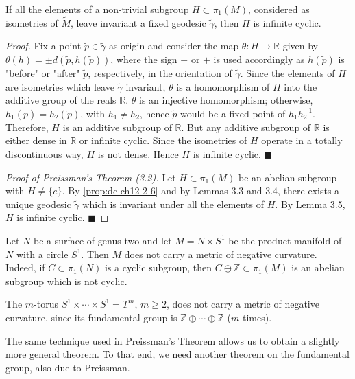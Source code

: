\begin{lemma}
  \label{lem:dc-ch12-3-5}
  If all the elements of a non-trivial subgroup $H\subset\pi_1(M)$, considered as
  isometries of $\tilde{M}$, leave invariant a fixed geodesic $\tilde{\gamma}$, then
  $H$ is infinite cyclic.
\end{lemma}
\begin{proof}
  Fix a point $\tilde{p}\in\tilde{\gamma}$ as origin and consider the map
  $\theta:H\to\mathbb{R}$ given by $\theta(h)=\pm d(\tilde{p},h(\tilde{p}))$, where
  the sign $-$ or $+$ is used accordingly as $h(\tilde{p})$ is "before" or "after"
  $\tilde{p}$, respectively, in the orientation of $\tilde{\gamma}$. Since the
  elements of $H$ are isometries which leave $\tilde{\gamma}$ invariant, $\theta$ is
  a homomorphism of $H$ into the additive group of the reals $\mathbb{R}$. $\theta$
  is an injective homomorphism; otherwise, $h_1(\tilde{p})=h_2(\tilde{p})$, with
  $h_1\neq h_2$, hence $\tilde{p}$ would be a fixed point of $h_1h_2^{-1}$.
  Therefore, $H$ is an additive subgroup of $\mathbb{R}$. But any additive subgroup
  of $\mathbb{R}$ is either dense in $\mathbb{R}$ or infinite cyclic. Since the
  isometries of $H$ operate in a totally discontinuous way, $H$ is not dense. Hence
  $H$ is infinite cyclic. $\blacksquare$
  
  \emph{Proof of Preissman's Theorem (3.2).} Let $H\subset\pi_1(M)$ be an abelian
  subgroup with $H\neq\{e\}$. By \cref{prop:dc-ch12-2-6} and by Lemmas 3.3 and 3.4, there
  exists a unique geodesic $\tilde{\gamma}$ which is invariant under all the
  elements of $H$. By Lemma 3.5, $H$ is infinite cyclic. $\blacksquare$
\end{proof}

\begin{example}
  \label{ex:dc-ch12-3-6}
  Let $N$ be a surface of genus two and let $M=N\times S^1$ be the product manifold
  of $N$ with a circle $S^1$. Then $M$ does not carry a metric of negative
  curvature. Indeed, if $C\subset\pi_1(N)$ is a cyclic subgroup, then
  $C\oplus\mathbb{Z}\subset\pi_1(M)$ is an abelian subgroup which is not cyclic.
\end{example}

\begin{example}[$m$-torus]
  \label{ex:dc-ch12-3-7}
  The $m$-torus $S^1\times\cdots\times S^1=T^m$, $m\geq 2$, does not carry a metric
  of negative curvature, since its fundamental group is
  $\mathbb{Z}\oplus\cdots\oplus\mathbb{Z}$ ($m$ times).
  
  The same technique used in Preissman's Theorem allows us to obtain a slightly more
  general theorem. To that end, we need another theorem on the fundamental group,
  also due to Preissman.
\end{example}

